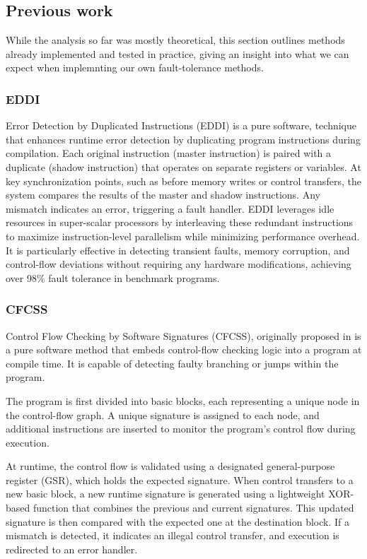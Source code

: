 \subsection{Previous work}

While the analysis so far was mostly theoretical, this section outlines methods already implemented and tested in practice, giving an insight into what we can expect when implemnting our own fault-tolerance methods.

\subsubsection{EDDI}

Error Detection by Duplicated Instructions \cite{eddi} (EDDI) is a pure software, technique that enhances runtime error detection by duplicating program instructions during compilation. Each original instruction (master instruction) is paired with a duplicate (shadow instruction) that operates on separate registers or variables. At key synchronization points, such as before memory writes or control transfers, the system compares the results of the master and shadow instructions. Any mismatch indicates an error, triggering a fault handler. EDDI leverages idle resources in super-scalar processors by interleaving these redundant instructions to maximize instruction-level parallelism while minimizing performance overhead. It is particularly effective in detecting transient faults, memory corruption, and control-flow deviations without requiring any hardware modifications, achieving over 98\% fault tolerance in benchmark programs.


\subsubsection{CFCSS}

Control Flow Checking by Software Signatures (CFCSS), originally proposed in \cite{994926} is a pure software method that embeds control-flow checking logic into a program at compile time. It is capable of detecting faulty branching or jumps within the program. 

The program is first divided into basic blocks, each representing a unique node in the control-flow graph. A unique signature is assigned to each node, and additional instructions are inserted to monitor the program's control flow during execution.

At runtime, the control flow is validated using a designated general-purpose register (GSR), which holds the expected signature. When control transfers to a new basic block, a new runtime signature is generated using a lightweight XOR-based function that combines the previous and current signatures. This updated signature is then compared with the expected one at the destination block. If a mismatch is detected, it indicates an illegal control transfer, and execution is redirected to an error handler.

